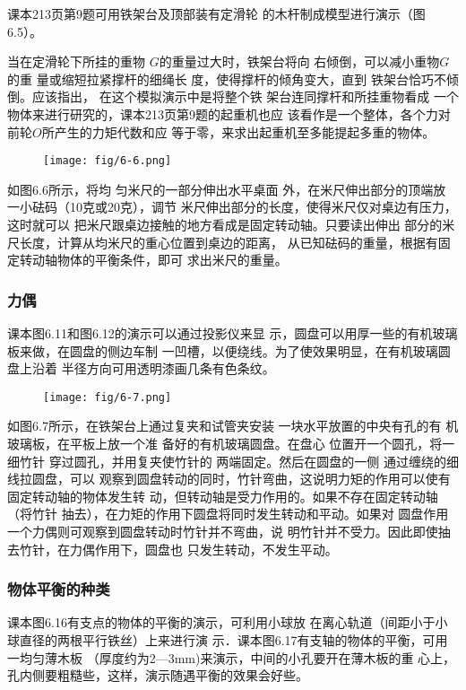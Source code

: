 课本213页第9题可用铁架台及顶部装有定滑轮
的木杆制成模型进行演示（图6.5）。


当在定滑轮下所挂的重物
$G$的重量过大时，铁架台将向
右倾倒，可以减小重物$G$的重
量或缩短拉紧撑杆的细绳长
度，使得撑杆的倾角变大，直到
铁架台恰巧不倾倒。应该指出，
在这个模拟演示中是将整个铁
架台连同撑杆和所挂重物看成
一个物体来进行研究的，课本213页第9题的起重机也应
该看作是一个整体，各个力对前轮$O$所产生的力矩代数和应
等于零，来求出起重机至多能提起多重的物体。

\begin{figure}[htp]
    \centering
    \texttt{[image: fig/6-6.png]}
    \caption{}
\end{figure}

如图6.6所示，将均
匀米尺的一部分伸出水平桌面
外，在米尺伸出部分的顶端放
一小砝码（10克或20克），调节
米尺伸出部分的长度，使得米尺仅对桌边有压力，这时就可以
把米尺跟桌边接触的地方看成是固定转动轴。只要读出伸出
部分的米尺长度，计算从均米尺的重心位置到桌边的距离，
从已知砝码的重量，根据有固定转动轴物体的平衡条件，即可
求出米尺的重量。

\subsubsection{力偶}
课本图6.11和图6.12的演示可以通过投影仪来显
示，圆盘可以用厚一些的有机玻璃板来做，在圆盘的侧边车制
一凹槽，以便绕线。为了使效果明显，在有机玻璃圆盘上沿着
半径方向可用透明漆画几条有色条纹。

\begin{figure}[htp]
    \centering
    \texttt{[image: fig/6-7.png]}
    \caption{}
\end{figure}

如图6.7所示，在铁架台上通过复夹和试管夹安装
一块水平放置的中央有孔的有
机玻璃板，在平板上放一个准
备好的有机玻璃圆盘。在盘心
位置开一个圆孔，将一细竹针
穿过圆孔，并用复夹使竹针的
两端固定。然后在圆盘的一侧
通过缠绕的细线拉圆盘，可以
观察到圆盘转动的同时，竹针弯曲，这说明力矩的作用可以使有固定转动轴的物体发生转
动，但转动轴是受力作用的。如果不存在固定转动轴（将竹针
抽去），在力矩的作用下圆盘将同时发生转动和平动。如果对
圆盘作用一个力偶则可观察到圆盘转动时竹针并不弯曲，说
明竹针并不受力。因此即使抽去竹针，在力偶作用下，圆盘也
只发生转动，不发生平动。

\subsubsection{物体平衡的种类}
课本图6.16有支点的物体的平衡的演示，可利用小球放
在离心轨道（间距小于小球直径的两根平行铁丝）上来进行演
示．课本图6.17有支轴的物体的平衡，可用一均匀薄木板
（厚度约为2—3mm)来演示，中间的小孔要开在薄木板的重
心上，孔内侧要粗糙些，这样，演示随遇平衡的效果会好些。


